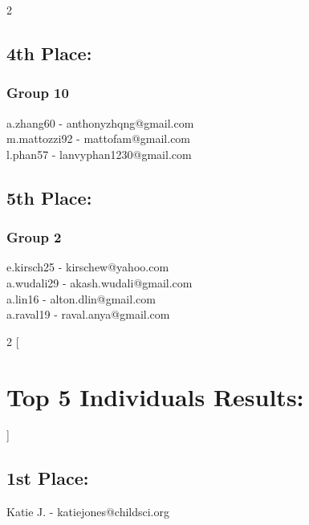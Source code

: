 \documentclass{article}
\begin{document}
\begin{multicols}{2}
    \subsection*{4th Place:}
    \subsubsection*{Group 10}
    a.zhang60 - anthonyzhqng@gmail.com \\ m.mattozzi92 - mattofam@gmail.com \\ l.phan57 - lanvyphan1230@gmail.com
    \subsection*{5th Place:}
    \subsubsection*{Group 2}
    e.kirsch25 - kirschew@yahoo.com \\ a.wudali29 - akash.wudali@gmail.com \\ a.lin16 - alton.dlin@gmail.com \\ a.raval19 - raval.anya@gmail.com\end{multicols}

    \begin{multicols}{2}
    [
    \section*{Top 5 Individuals Results:}
    ]\subsection*{1st Place:}
        Katie J. - katiejones@childsci.org

    \end{multicols}

\end{document}
